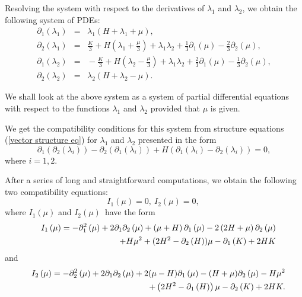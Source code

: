 \documentclass{article}
\begin{document}
Resolving the system with respect to the derivatives of $\lambda _{1}$ and $%
\lambda _{2}$, we obtain the following system of PDEs:
\begin{eqnarray*}
\partial _{1}\left( \lambda _{1}\right) &\!\!\!\!=&\!\!\!\!\lambda
_{1}\left( H+\lambda _{1}+\mu \right) , \\
\partial _{2}\left( \lambda _{1}\right) &\!\!\!\!=&\!\!\!\!\frac{K}{3}%
+H\left( \lambda _{1}+\frac{\mu }{3}\right) +\lambda _{1}\lambda _{2}+\frac{1%
}{3}\partial _{1}\left( \mu \right) -\frac{2}{3}\partial _{2}\left( \mu
\right) , \\
\partial _{1}\left( \lambda _{2}\right) &\!\!\!\!=&\!\!\!\!-\frac{K}{3}%
+H\left( \lambda _{2}-\frac{\mu }{3}\right) +\lambda _{1}\lambda _{2}+\frac{2%
}{3}\partial _{1}\left( \mu \right) -\frac{1}{3}\partial _{2}\left( \mu
\right) , \\
\partial _{2}\left( \lambda _{2}\right) &\!\!\!\!=&\!\!\!\!\lambda
_{2}\left( H+\lambda _{2}-\mu \right) .
\end{eqnarray*}

We shall look at the above system as a system of partial differential
equations with respect to the functions $\lambda _{1}$ and $\lambda _{2}$
provided that $\mu $ is given.

We get the compatibility conditions for this system from structure equations
(\ref{vector structure eq}) for $\lambda _{1}$ and $\lambda _{2}$ presented
in the form
\begin{equation*}
\partial _{1}(\partial _{2}\left( \lambda _{i}\right) )-\partial
_{2}(\partial _{1}\left( \lambda _{i}\right) )+H\left( \partial _{1}\left(
\lambda _{i}\right) -\partial _{2}\left( \lambda _{i}\right) \right) =0,
\end{equation*}%
where $i=1,2.$

After a series of long and straightforward computations, we obtain the
following two compatibility equations:
\begin{equation}
I_{1}\left( \mu \right) =0,\ I_{2}\left( \mu \right) =0,\
\label{Compability Equations}
\end{equation}%
where $I_{1}\left( \mu \right) $ and $I_{2}\left( \mu \right) $\ have the
form
\begin{eqnarray}
&&I_{1}\left( \mu \right) =-\partial _{1}^{2}\left( \mu \right) +2\partial
_{1}\partial _{2}\left( \mu \right) +\left( \mu +H\right) \partial
_{1}\left( \mu \right) -2\left( 2H+\mu \right) \partial _{2}\left( \mu
\right)  \notag \\
&&+H\mu ^{2}+(2H^{2}-\partial _{2}\left( H\right) )\mu -\partial _{1}\left(
K\right) +2HK  \notag
\end{eqnarray}%
and
\begin{eqnarray}
&&I_{2}\left( \mu \right) =-\partial _{2}^{2}\left( \mu \right) +2\partial
_{1}\partial _{2}\left( \mu \right) +2(\mu -H)\partial _{1}\left( \mu
\right) -(H+\mu )\partial _{2}\left( \mu \right) -H\mu ^{2}  \notag \\
&&+\left( 2H^{2}-\partial _{1}\left( H\right) \right) \mu -\partial
_{2}\left( K\right) +2HK.  \notag
\end{eqnarray}
\end{document}
